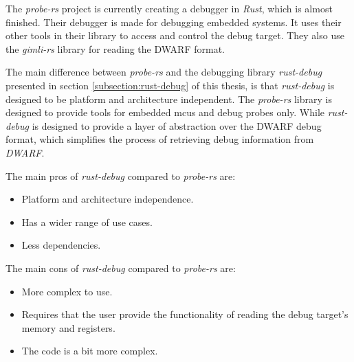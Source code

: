 
The \emph{probe-rs} project is currently creating a debugger in \emph{Rust}, which is almost finished.
Their debugger is made for debugging embedded systems.
It uses their other tools in their library to access and control the debug target.
They also use the \emph{gimli-rs} library for reading the \gls{DWARF} format.


The main difference between \emph{probe-rs} and the debugging library \emph{rust-debug} presented in section \ref{subsection:rust-debug} of this thesis, is that \emph{rust-debug} is designed to be platform and architecture independent.
The \emph{probe-rs} library is designed to provide tools for embedded \glspl{mcu} and debug probes only.
While \emph{rust-debug} is designed to provide a layer of abstraction over the \gls{DWARF} debug format, which simplifies the process of retrieving debug information from \emph{DWARF}.

The main pros of \emph{rust-debug} compared to \emph{probe-rs} are:
\begin{itemize}
  \item Platform and architecture independence.
  \item Has a wider range of use cases.
  \item Less dependencies.
\end{itemize}

The main cons of \emph{rust-debug} compared to \emph{probe-rs} are:
\begin{itemize}
  \item More complex to use.
  \item Requires that the user provide the functionality of reading the debug target's memory and registers.
  \item The code is a bit more complex.
\end{itemize}

